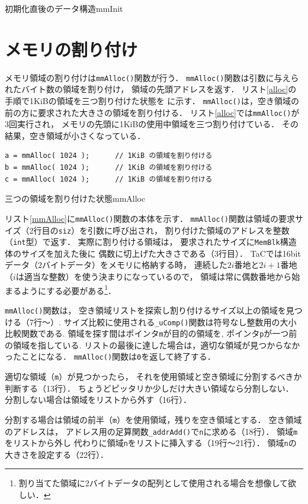 {初期化直後のデータ構造}{mmInit}

\section{メモリの割り付け}
メモリ領域の割り付けは{\tt mmAlloc()}関数が行う．
{\tt mmAlloc()}関数は引数に与えられたバイト数の領域を割り付け，
領域の先頭アドレスを返す．
リスト\ref{alloc}の手順で1KiBの領域を三つ割り付けた状態を
に示す．
{\tt mmAlloc()}は，空き領域の前の方に要求された大きさの領域を割り付ける．
リスト\ref{alloc}では{\tt mmAlloc()}が3回実行され，
メモリの先頭に1KiBの使用中領域を三つ割り付けている．
その結果，空き領域が小さくなっている．

\begin{lstlisting}[float=btp,label=alloc, caption=1KiBの領域を三つ割り付ける]
a = mmAlloc( 1024 );      // 1KiB の領域を割り付ける
b = mmAlloc( 1024 );      // 1KiB の領域を割り付ける
c = mmAlloc( 1024 );      // 1KiB の領域を割り付ける
\end{lstlisting}

{三つの領域を割り付けた状態}{mmAlloc}

リスト\ref{mmAlloc}に{\tt mmAlloc()}関数の本体を示す．
{\tt mmAlloc()}関数は領域の要求サイズ（2行目の{\tt siz}）を引数に呼び出され，
割り付けた領域のアドレスを整数（{\tt int}型）で返す．
実際に割り付ける領域は，
要求されたサイズに{\tt MemBlk}構造体のサイズを加えた後に
偶数に切上げた大きさである（3行目）．
TaCでは16bitデータ（2バイトデータ）をメモリに格納する時，
連続した$2i$番地と$2i+1$番地（$i$は適当な整数）を使う決まりになっているので，
領域は常に偶数番地から始まるようにする必要がある\footnote{
割り当てた領域に2バイトデータの配列として使用される場合を想像して欲しい．}．

{\tt mmAlloc()}関数は，
空き領域リストを探索し割り付けるサイズ以上の領域を見つける（7行〜）.
サイズ比較に使用される{\tt \_uComp()}関数は符号なし整数用の大小比較関数である.
領域を探す間はポインタ{\tt m}が目的の領域を,
ポインタ{\tt p}が一つ前の領域を指している.
リストの最後に達した場合は，適切な領域が見つからなかったことになる．
{\tt mmAlloc()}関数は{\tt 0}を返して終了する．

適切な領域（{\tt m}）が見つかったら，
それを使用領域と空き領域に分割するべきか判断する（13行）．
ちょうどピッタリか少しだけ大きい領域なら分割しない．
分割しない場合は領域をリストから外す（16行）．

分割する場合は領域の前半（{\tt m}）を使用領域，残りを空き領域とする．
空き領域のアドレスは，
アドレス用の足算関数{\tt \_addrAdd()}で{\tt n}に求める（18行）．
領域{\tt m}をリストから外し
代わりに領域{\tt n}をリストに挿入する（19行〜21行）．
領域{\tt n}の大きさを設定する（22行）．

